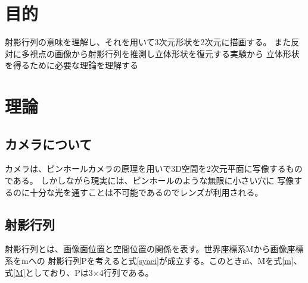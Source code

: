 \documentclass[11pt,a4j]{jsarticle}
\begin{document}


\section{目的}
射影行列の意味を理解し、それを用いて3次元形状を2次元に描画する。
また反対に多視点の画像から射影行列を推測し立体形状を復元する実験から
立体形状を得るために必要な理論を理解する


\section{理論}
\label{sec:理論}


\subsection{カメラについて}
\label{sub:カメラについて}

カメラは、ピンホールカメラの原理を用いで3D空間を2次元平面に写像するものである。
しかしながら現実には、ピンホールのような無限に小さい穴に
写像するのに十分な光を通すことは不可能であるのでレンズが利用される。


\subsection{射影行列}
\label{sub:射影行列}
射影行列とは、画像面位置と空間位置の関係を表す。世界座標系Mから画像座標系をmへの
射影行列Pを考えると式\ref{syaei}が成立する。このとき\~m、\~Mを式\ref{m}、式\ref{M}としており、Pは3×4行列である。
\end{document}
